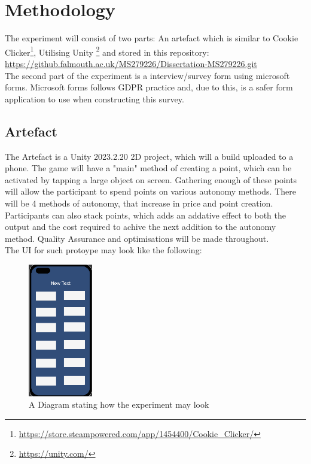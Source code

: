 \documentclass[conference]{IEEEtran}
\begin{document}
\section{Methodology}
 The experiment will consist of two parts: An artefact which is similar to Cookie Clicker\footnote{\url{https://store.steampowered.com/app/1454400/Cookie_Clicker/}}, Utilising Unity \footnote{\url{https://unity.com/}} and stored in this repository:\\

\url{https://github.falmouth.ac.uk/MS279226/Dissertation-MS279226.git}\\

The second part of the experiment is a interview/survey form using microsoft forms. Microsoft forms follows GDPR practice and, due to this, is a safer form application to use when constructing this survey.

\subsection{Artefact}
The Artefact is a Unity 2023.2.20 2D project, which will a build uploaded to a phone. The game will have a "main" method of creating a point, which can be activated by tapping a large object on screen. Gathering enough of these points will allow the participant to spend points on various autonomy methods. There will be 4 methods of autonomy, that increase in price and point creation. Participants can also stack points, which adds an addative effect to both the output and the cost required to achive the next addition to the autonomy method. Quality Assurance and optimisations will be made throughout.\\

The UI for such protoype may look like the following:

\begin{figure}[H]
\begin{center}
\includegraphics[width = 0.25\textwidth, ]{Sim1}
\caption{A Diagram stating how the experiment may look}
\end{center}
\end{figure}
\end{document}
